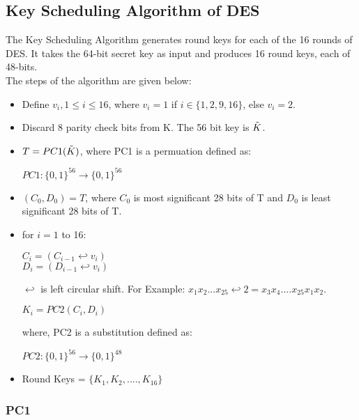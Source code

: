 \documentclass[11pt]{article}
\begin{document}
\subsection{Key Scheduling Algorithm of DES}
The Key Scheduling Algorithm generates round keys for each of the 16 rounds of DES. It takes the 64-bit secret key as input and produces 16 round keys, each of 48-bits.\\
The steps of the algorithm are given below:
\begin{itemize}
    \item Define $v_i, 1 \leq i \leq 16$, where $v_i = 1$ if $i \in \{1, 2, 9, 16\}$, else $v_i = 2$. 
    \item Discard 8 parity check bits from K. The 56 bit key is $\Tilde{K}$.
    \item $T = PC1(\Tilde{K})$, where PC1 is a permuation defined as:
    \begin{center}
        $PC1: \{0, 1\}^{56} \rightarrow \{0, 1\}^{56}$\\
    \end{center}

    \item $(C_0, D_0) = T$, where $C_0$ is most significant 28 bits of T and $D_0$ is least significant 28 bits of T.

    \item for $i = 1$ to 16:
    \begin{center}
        $C_i = (C_{i-1} \hookleftarrow v_i)$\\
        $D_i = (D_{i-1} \hookleftarrow v_i)$\\
    \end{center}
    $\hookleftarrow$ is left circular shift. For Example: $x_1x_2...x_{25} \hookleftarrow 2 = x_3x_4....x_{25}x_1x_2$.
    \begin{center}
        $K_i = PC2(C_i, D_i)$\\
    \end{center}
    where, PC2 is a substitution defined as:
    \begin{center}
        $PC2: \{0, 1\}^{56} \rightarrow \{0, 1\}^{48}$\\
    \end{center}

    \item Round Keys = $\{K_1, K_2,...., K_{16}\}$
\end{itemize}

\subsubsection{PC1}
\end{document}
